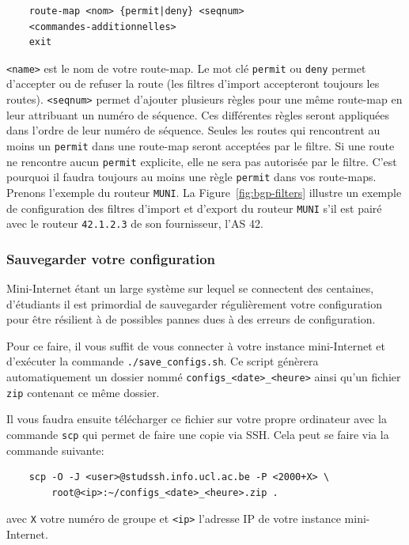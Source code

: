 \documentclass[a4paper, 11pt]{article}
\begin{document}
\begin{verbatim}
    route-map <nom> {permit|deny} <seqnum>
    <commandes-additionnelles>
    exit
\end{verbatim}
\texttt{<name>} est le nom de votre route-map. Le mot clé \texttt{permit}
ou \texttt{deny} permet d'accepter ou de refuser la route (les
filtres d'import accepteront toujours les routes). \texttt{<seqnum>}
permet d'ajouter plusieurs règles pour une même route-map en leur attribuant un
numéro de séquence. Ces différentes
règles seront appliquées dans l'ordre de leur numéro de séquence. Seules
les routes qui rencontrent au moins un \texttt{permit} dans une route-map
seront acceptées par le filtre.
Si une route ne rencontre aucun \texttt{permit} explicite, elle ne sera
pas autorisée par le filtre. C'est pourquoi il faudra toujours au moins une
règle \texttt{permit} dans vos route-maps. Prenons l'exemple du routeur
\texttt{MUNI}. La Figure~\ref{fig:bgp-filters} illustre un exemple
de configuration des filtres d'import et d'export du routeur \texttt{MUNI}
s'il est pairé avec le routeur \texttt{42.1.2.3} de son fournisseur, l'AS 42.


\subsubsection{Sauvegarder votre configuration}

Mini-Internet étant un large système sur lequel se connectent des centaines,
d'étudiants il est primordial de sauvegarder régulièrement votre configuration
pour être résilient à de possibles pannes dues à des erreurs de configuration.

Pour ce faire, il vous suffit de vous connecter à votre instance mini-Internet
et d'exécuter la commande \texttt{./save\_configs.sh}. Ce script génèrera
automatiquement un dossier nommé \texttt{configs\_<date>\_<heure>} ainsi
qu'un fichier \texttt{zip} contenant ce même dossier.

Il vous faudra ensuite télécharger ce fichier sur votre propre ordinateur avec
la commande \texttt{scp} qui permet de faire une copie via SSH. Cela peut se faire
via la commande suivante:


\begin{verbatim}
    scp -O -J <user>@studssh.info.ucl.ac.be -P <2000+X> \
        root@<ip>:~/configs_<date>_<heure>.zip .
\end{verbatim}

avec \texttt{X} votre numéro de groupe et \texttt{<ip>} l'adresse IP de votre
instance mini-Internet.
\end{document}
